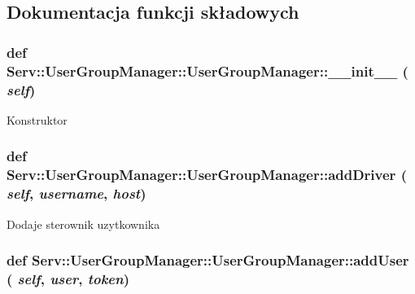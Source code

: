 \subsection{Dokumentacja funkcji składowych}
\hypertarget{class_serv_1_1_user_group_manager_1_1_user_group_manager_af43f9798f1e93dd8425699ecd6de6c87}{
\subsubsection[{\_\-\_\-init\_\-\_\-}]{\setlength{\rightskip}{0pt plus 5cm}def Serv::UserGroupManager::UserGroupManager::\_\-\_\-init\_\-\_\- ( {\em self})}}
\label{class_serv_1_1_user_group_manager_1_1_user_group_manager_af43f9798f1e93dd8425699ecd6de6c87}
\begin{DoxyVerb}Konstruktor\end{DoxyVerb}
 \hypertarget{class_serv_1_1_user_group_manager_1_1_user_group_manager_aea0f7f8d1d6e4d5efce31f3d0ea35fd9}{
\subsubsection[{addDriver}]{\setlength{\rightskip}{0pt plus 5cm}def Serv::UserGroupManager::UserGroupManager::addDriver ( {\em self}, \/   {\em username}, \/   {\em host})}}
\label{class_serv_1_1_user_group_manager_1_1_user_group_manager_aea0f7f8d1d6e4d5efce31f3d0ea35fd9}
\begin{DoxyVerb}Dodaje sterownik uzytkownika\end{DoxyVerb}
 \hypertarget{class_serv_1_1_user_group_manager_1_1_user_group_manager_a46ee225566738a93c7c036b464a931fb}{
\subsubsection[{addUser}]{\setlength{\rightskip}{0pt plus 5cm}def Serv::UserGroupManager::UserGroupManager::addUser ( {\em self}, \/   {\em user}, \/   {\em token})}}
